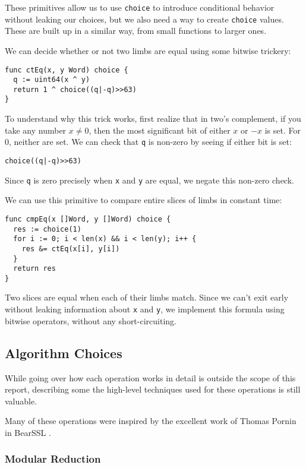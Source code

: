 \documentclass[11pt, a4paper]{article} %
\begin{document}
{These primitives allow us to use \texttt{choice} to introduce conditional
behavior without leaking our choices, but we also need
a way to
create \texttt{choice} values. These are built up
in a similar way, from small functions to larger ones.

We can decide whether or not two limbs are equal using some bitwise
trickery:

\begin{verbatim}
func ctEq(x, y Word) choice {
  q := uint64(x ^ y)
  return 1 ^ choice((q|-q)>>63)
}
\end{verbatim}

To understand why this trick works, first realize that in two's complement,
if you take any number $x \neq 0$,
then the most significant bit of either $x$ or $-x$ is set.
For $0$, neither are set.
We can check that \texttt{q} is non-zero by seeing
if either bit is set:
\begin{verbatim}
choice((q|-q)>>63)
\end{verbatim}
Since \texttt{q} is zero precisely when \texttt{x} and \texttt{y}
are equal, we negate this non-zero check.

We can use this primitive to compare entire slices of limbs
in constant time:

\begin{verbatim}
func cmpEq(x []Word, y []Word) choice {
  res := choice(1)
  for i := 0; i < len(x) && i < len(y); i++ {
    res &= ctEq(x[i], y[i])
  }
  return res
}
\end{verbatim}

Two slices are equal when each of their limbs match.
Since we can't exit early without leaking information
about \texttt{x} and \texttt{y}, we implement this formula
using bitwise operators, without any short-circuiting.

\subsection{Algorithm Choices}

While going over how each operation works in detail is outside
the scope of this report, describing some the high-level
techniques used for these operations is still valuable.

Many of these operations were inspired by the excellent
work of Thomas Pornin in BearSSL
\cite{pornin_bearssl_2020-1}.

\subsubsection{Modular Reduction}

}
\end{document}
